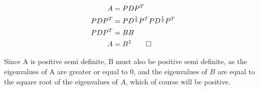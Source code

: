 \documentclass[12pt,twoside]{article}
\begin{document}
\begin{equation}
    \begin{split}
        A &= PDP^T \\
        PDP^T &= PD^{\frac{1}{2}}P^TPD^{\frac{1}{2}}P^T\\
        PDP^T &= BB\\
        A &= B^2 \qed
    \end{split}
\end{equation}

Since A is positive semi definite, B must also be positive semi definite, as the eigenvalues of A are greater or equal to 0, and the eigenvalues of $B$ are equal to the square root of the eigenvalues of $A$, which of course will be positive.


%
%
\end{document}
